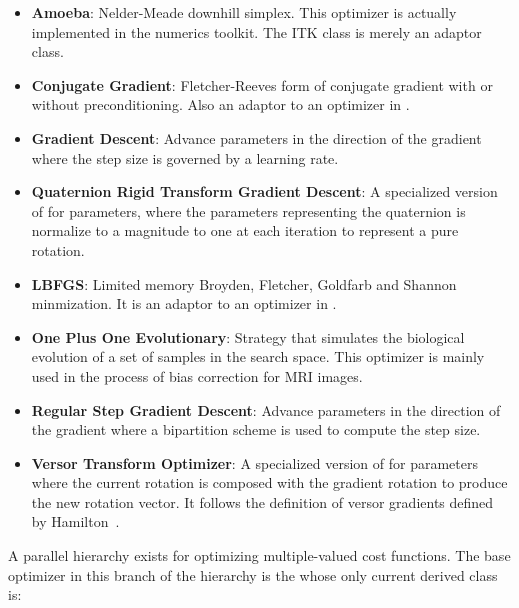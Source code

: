 \begin{itemize}

\item \textbf{Amoeba}: Nelder-Meade downhill simplex.  This optimizer is
actually implemented in the  numerics toolkit.  The ITK class
 is merely an adaptor class.

\item \textbf{Conjugate Gradient}: Fletcher-Reeves form 
of conjugate gradient with or without preconditioning. Also an adaptor to an
optimizer in .

\item \textbf{Gradient Descent}: Advance parameters in the direction of the
gradient where the step size is governed by a learning rate. 

\item \textbf{Quaternion Rigid Transform Gradient Descent}: 
A specialized version of  for
 parameters, where the parameters representing
the quaternion is normalize to a magnitude to one at each iteration to
represent a pure rotation.

\item \textbf{LBFGS}: Limited memory Broyden, Fletcher, Goldfarb
and Shannon minmization. It is an adaptor to an optimizer in .

\item \textbf{One Plus One Evolutionary}: Strategy that simulates the
biological evolution of a set of samples in the search space. This optimizer
is mainly used in the process of bias correction for MRI images.

\item \textbf{Regular Step Gradient Descent}: Advance parameters in the
direction of the gradient where a bipartition scheme is used to compute
the step size. 

\item \textbf{Versor Transform Optimizer}: A specialized version of
 for 
parameters  where the current rotation is composed with the gradient rotation
to produce the new rotation vector. It follows the definition of versor
gradients defined by Hamilton~\cite{Hamilton1866}.

\end{itemize}

A parallel hierarchy exists for optimizing multiple-valued cost functions. The
base optimizer in this branch of the hierarchy is the
 whose only current derived class
is:

